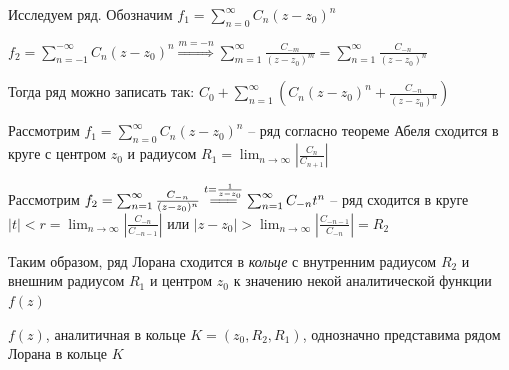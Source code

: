 \documentclass[12pt]{article}
\begin{document}
\Nota Исследуем ряд. Обозначим $f_1 = \sum_{n = 0}^\infty C_n (z - z_0)^n$

$f_2 = \sum_{n = -1}^{-\infty} C_n (z - z_0)^n \overset{m = -n}{\Longrightarrow} \sum_{m = 1}^\infty \frac{C_{-m}}{(z - z_0)^m} = \sum_{n = 1}^\infty \frac{C_{-n}}{(z - z_0)^n}$

Тогда ряд можно записать так: $C_0 + \sum_{n = 1}^\infty \left(C_n (z - z_0)^n + \frac{C_{-n}}{(z - z_0)^n}\right)$

Рассмотрим $f_1 = \sum_{n = 0}^\infty C_n (z - z_0)^n$ -- ряд согласно теореме Абеля сходится в круге с центром $z_0$ и радиусом $R_1 = \lim_{n \to \infty} \left|\frac{C_{n}}{C_{n+1}}\right|$

Рассмотрим $f_2 = \sum_{n = 1}^\infty \frac{C_{-n}}{(z - z_0)^n} \overset{t = \frac{1}{z - z_0}}{=\joinrel=\joinrel=} \sum_{n = 1}^\infty C_{-n} t^n$ -- ряд сходится в круге $|t| < r = \lim_{n \to \infty} \left|\frac{C_{-n}}{C_{-n-1}}\right|$ или $|z - z_0| > \lim_{n \to \infty} \left|\frac{C_{-n-1}}{C_{-n}}\right| = R_2$

Таким образом, ряд Лорана сходится в \textit{кольце} с внутренним радиусом $R_2$ и внешним радиусом $R_1$ и центром $z_0$ к значению некой аналитической функции $f(z)$


\begin{MyTheorem}
    $f(z)$, аналитичная в кольце $K = (z_0, R_2, R_1)$, однозначно представима рядом Лорана в кольце $K$
\end{MyTheorem}
\end{document}
